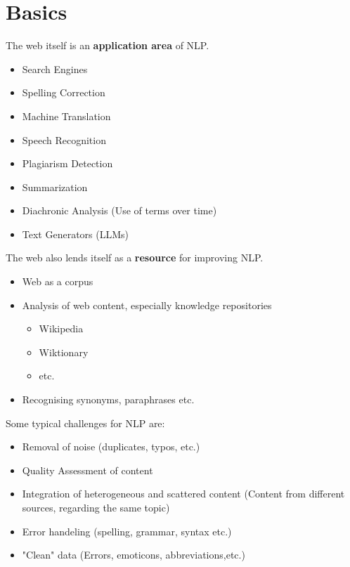 \documentclass[
../../NLP4W_Summary.tex,
]
{subfiles}
\begin{document}
\section{Basics}
The web itself is an \textbf{application area} of NLP. 

\begin{greenbox}
    \begin{itemize}
        \item Search Engines
        \item Spelling Correction
        \item Machine Translation
        \item Speech Recognition
        \item Plagiarism Detection
        \item Summarization
        \item Diachronic Analysis (Use of terms over time)
        \item Text Generators (LLMs)
    \end{itemize}
\end{greenbox}

The web also lends itself as a \textbf{resource} for improving NLP.

\begin{greenbox}
    \begin{itemize}
        \item Web as a corpus
        \item Analysis of web content, especially knowledge repositories
        \begin{itemize}
            \item Wikipedia
            \item Wiktionary
            \item etc.
        \end{itemize}
        \item Recognising synonyms, paraphrases etc.
    \end{itemize}
\end{greenbox}

Some typical challenges for NLP are:

\begin{greenbox}
    \begin{itemize}
        \item Removal of noise (duplicates, typos, etc.)
        \item Quality Assessment of content
        \item Integration of heterogeneous and scattered content (Content from different sources, regarding the same topic)
        \item Error handeling (spelling, grammar, syntax etc.)
        \item "Clean" data (Errors, emoticons, abbreviations,etc.)
    \end{itemize}
\end{greenbox}
\end{document}

